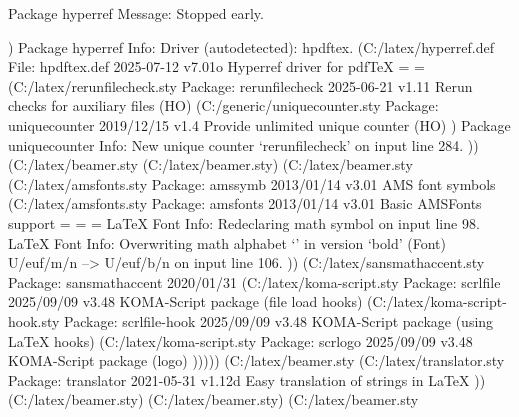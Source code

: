 Package hyperref Message: Stopped early.

)
Package hyperref Info: Driver (autodetected): hpdftex.
 (C:\Users\SEARS\AppData\Local\Programs\MiKTeX\tex/latex/hyperref\hpdftex.def
File: hpdftex.def 2025-07-12 v7.01o Hyperref driver for pdfTeX
\Fld@listcount=
\c@bookmark@seq@number=
 (C:\Users\SEARS\AppData\Local\Programs\MiKTeX\tex/latex/rerunfilecheck\rerunfilecheck.sty
Package: rerunfilecheck 2025-06-21 v1.11 Rerun checks for auxiliary files (HO)
 (C:\Users\SEARS\AppData\Local\Programs\MiKTeX\tex/generic/uniquecounter\uniquecounter.sty
Package: uniquecounter 2019/12/15 v1.4 Provide unlimited unique counter (HO)
)
Package uniquecounter Info: New unique counter `rerunfilecheck' on input line 284.
)) (C:\Users\SEARS\AppData\Local\Programs\MiKTeX\tex/latex/beamer\beamerbaserequires.sty (C:\Users\SEARS\AppData\Local\Programs\MiKTeX\tex/latex/beamer\beamerbasecompatibility.sty) (C:\Users\SEARS\AppData\Local\Programs\MiKTeX\tex/latex/beamer\beamerbasefont.sty (C:\Users\SEARS\AppData\Local\Programs\MiKTeX\tex/latex/amsfonts\amssymb.sty
Package: amssymb 2013/01/14 v3.01 AMS font symbols
 (C:\Users\SEARS\AppData\Local\Programs\MiKTeX\tex/latex/amsfonts\amsfonts.sty
Package: amsfonts 2013/01/14 v3.01 Basic AMSFonts support
\@emptytoks=
\symAMSa=
\symAMSb=
LaTeX Font Info:    Redeclaring math symbol \hbar on input line 98.
LaTeX Font Info:    Overwriting math alphabet `\mathfrak' in version `bold'
(Font)                  U/euf/m/n --> U/euf/b/n on input line 106.
)) (C:\Users\SEARS\AppData\Local\Programs\MiKTeX\tex/latex/sansmathaccent\sansmathaccent.sty
Package: sansmathaccent 2020/01/31
 (C:\Users\SEARS\AppData\Local\Programs\MiKTeX\tex/latex/koma-script\scrlfile.sty
Package: scrlfile 2025/09/09 v3.48 KOMA-Script package (file load hooks)
 (C:\Users\SEARS\AppData\Local\Programs\MiKTeX\tex/latex/koma-script\scrlfile-hook.sty
Package: scrlfile-hook 2025/09/09 v3.48 KOMA-Script package (using LaTeX hooks)
 (C:\Users\SEARS\AppData\Local\Programs\MiKTeX\tex/latex/koma-script\scrlogo.sty
Package: scrlogo 2025/09/09 v3.48 KOMA-Script package (logo)
))))) (C:\Users\SEARS\AppData\Local\Programs\MiKTeX\tex/latex/beamer\beamerbasetranslator.sty (C:\Users\SEARS\AppData\Local\Programs\MiKTeX\tex/latex/translator\translator.sty
Package: translator 2021-05-31 v1.12d Easy translation of strings in LaTeX
)) (C:\Users\SEARS\AppData\Local\Programs\MiKTeX\tex/latex/beamer\beamerbasemisc.sty) (C:\Users\SEARS\AppData\Local\Programs\MiKTeX\tex/latex/beamer\beamerbasetwoscreens.sty) (C:\Users\SEARS\AppData\Local\Programs\MiKTeX\tex/latex/beamer\beamerbaseoverlay.sty
